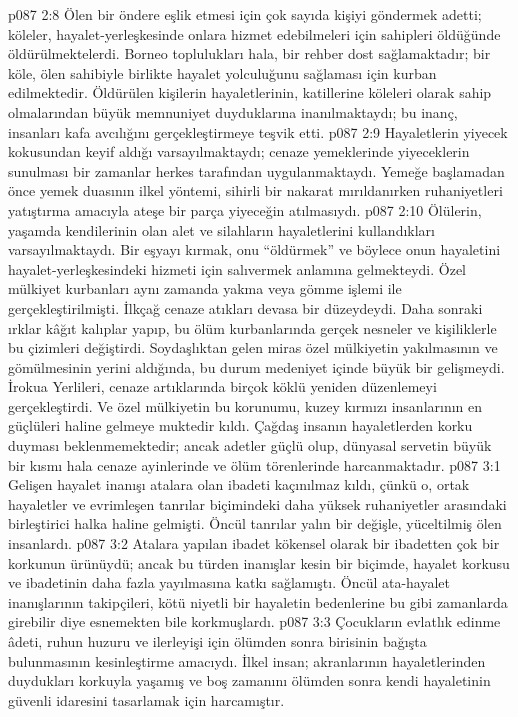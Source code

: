 \vs p087 2:8 Ölen bir öndere eşlik etmesi için çok sayıda kişiyi göndermek adetti; köleler, hayalet\hyp{}yerleşkesinde onlara hizmet edebilmeleri için sahipleri öldüğünde öldürülmektelerdi. Borneo toplulukları hala, bir rehber dost sağlamaktadır; bir köle, ölen sahibiyle birlikte hayalet yolculuğunu sağlaması için kurban edilmektedir. Öldürülen kişilerin hayaletlerinin, katillerine köleleri olarak sahip olmalarından büyük memnuniyet duyduklarına inanılmaktaydı; bu inanç, insanları kafa avcılığını gerçekleştirmeye teşvik etti.
\vs p087 2:9 Hayaletlerin yiyecek kokusundan keyif aldığı varsayılmaktaydı; cenaze yemeklerinde yiyeceklerin sunulması bir zamanlar herkes tarafından uygulanmaktaydı. Yemeğe başlamadan önce yemek duasının ilkel yöntemi, sihirli bir nakarat mırıldanırken ruhaniyetleri yatıştırma amacıyla ateşe bir parça yiyeceğin atılmasıydı.
\vs p087 2:10 Ölülerin, yaşamda kendilerinin olan alet ve silahların hayaletlerini kullandıkları varsayılmaktaydı. Bir eşyayı kırmak, onu “öldürmek” ve böylece onun hayaletini hayalet\hyp{}yerleşkesindeki hizmeti için salıvermek anlamına gelmekteydi. Özel mülkiyet kurbanları aynı zamanda yakma veya gömme işlemi ile gerçekleştirilmişti. İlkçağ cenaze atıkları devasa bir düzeydeydi. Daha sonraki ırklar kâğıt kalıplar yapıp, bu ölüm kurbanlarında gerçek nesneler ve kişiliklerle bu çizimleri değiştirdi. Soydaşlıktan gelen miras özel mülkiyetin yakılmasının ve gömülmesinin yerini aldığında, bu durum medeniyet içinde büyük bir gelişmeydi. İrokua Yerlileri, cenaze artıklarında birçok köklü yeniden düzenlemeyi gerçekleştirdi. Ve özel mülkiyetin bu korunumu, kuzey kırmızı insanlarının en güçlüleri haline gelmeye muktedir kıldı. Çağdaş insanın hayaletlerden korku duyması beklenmemektedir; ancak adetler güçlü olup, dünyasal servetin büyük bir kısmı hala cenaze ayinlerinde ve ölüm törenlerinde harcanmaktadır.
\vs p087 3:1 Gelişen hayalet inanışı atalara olan ibadeti kaçınılmaz kıldı, çünkü o, ortak hayaletler ve evrimleşen tanrılar biçimindeki daha yüksek ruhaniyetler arasındaki birleştirici halka haline gelmişti. Öncül tanrılar yalın bir değişle, yüceltilmiş ölen insanlardı.
\vs p087 3:2 Atalara yapılan ibadet kökensel olarak bir ibadetten çok bir korkunun ürünüydü; ancak bu türden inanışlar kesin bir biçimde, hayalet korkusu ve ibadetinin daha fazla yayılmasına katkı sağlamıştı. Öncül ata\hyp{}hayalet inanışlarının takipçileri, kötü niyetli bir hayaletin bedenlerine bu gibi zamanlarda girebilir diye esnemekten bile korkmuşlardı.
\vs p087 3:3 Çocukların evlatlık edinme âdeti, ruhun huzuru ve ilerleyişi için ölümden sonra birisinin bağışta bulunmasının kesinleştirme amacıydı. İlkel insan; akranlarının hayaletlerinden duydukları korkuyla yaşamış ve boş zamanını ölümden sonra kendi hayaletinin güvenli idaresini tasarlamak için harcamıştır.
